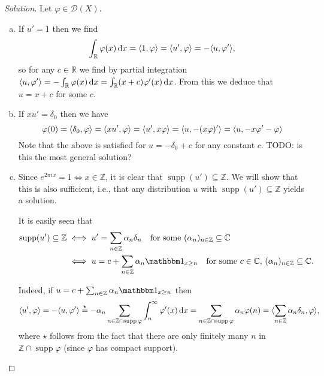 \documentclass{article}
\theoremstyle{plain}
\theoremstyle{remark}
\newenvironment{solution}{\begin{proof}[Solution]\renewcommand\qedsymbol{}}{\end{proof}}
\renewcommand{\phi}{\varphi}
\newcommand{\Bb}{\mathbb}
\newcommand{\Cal}{\mathcal}
\newcommand{\CC}{\Bb C}
\newcommand{\RR}{\Bb R}
\newcommand{\DD}{\Cal D}
\newcommand\ZZ{\Bb Z}
\DeclarePairedDelimiter{\ang}{\langle}{\rangle}
\newcommand\ind{\mathbbm 1} %
\newcommand\TODO{{\color{red} TODO: }}
\DeclareMathOperator{\supp}{supp}
\begin{document}
\begin{solution}
	Let $\phi \in \DD(X)$. 
	\begin{enumerate}[(a)]
		\item If $u' = 1$ then we find 
		\[
		\int_\RR \phi(x) \dd{x} = \ang{1, \phi} = \ang{u', \phi} = -\ang{u, \phi'},
		\]
		so for any $c \in \RR$ we find by partial integration $\ang{u, \phi'} = - \int_\RR\phi(x) \dd{x} = \int_\RR (x + c) \phi'(x) \dd{x}$. From this we deduce that $u = x + c$ for some $c$. 
		
		\item If $xu' = \delta_0$ then we have
		\[
		\phi(0) = \ang{\delta_0, \phi} = \ang{xu', \phi} = \ang{u', x\phi} = \ang{u, -(x\phi)'} = \ang{u, -x\phi' - \phi} %
		\]
		Note that the above is satisfied for $u = - \delta_0 + c$ for any constant $c$. \TODO is this the most general solution?
		
		\item Since $e^{2\pi i x} = 1 \iff x \in \ZZ$, it is clear that $\supp(u') \subseteq \ZZ$. We will show that this is also sufficient, i.e., that any distribution $u$ with $\supp(u') \subseteq \ZZ$ yields a solution. 
		
		It is easily seen that 
		\begin{align*}
		\supp(u') \subseteq  \ZZ &\iff u' = \sum_{n \in \ZZ} \alpha_n \delta_n \quad\text{for some $(\alpha_n)_{n \in \ZZ} \subseteq \CC$} \\
		&\iff u = c + \sum_{n\in \ZZ} \alpha_n \ind_{x \geq n} \quad\text{for some $c \in \CC$, $(\alpha_n)_{n \in \ZZ} \subseteq \CC$}. 
		\end{align*}
		
		Indeed, if $u = c + \sum_{n \in \ZZ} \alpha_n \ind_{x \geq n}$ then 
		\[
		\ang{u', \phi} = -\ang{u, \phi'} \overset\star= - \alpha_n \sum_{n \in \ZZ \cap \supp\phi} \int_n^\infty \phi'(x) \dd{x} = \sum_{n \in \ZZ \cap \supp\phi} \alpha_n \phi(n) = \ang{\sum_{n \in \ZZ} \alpha_n\delta_n, \phi}, 
		\]
		where $\star$ follows from the fact that there are only finitely many $n$ in $\ZZ \cap \supp\phi$ (since $\phi$ has compact support). 
 		

\end{enumerate}
\end{solution}
\end{document}
